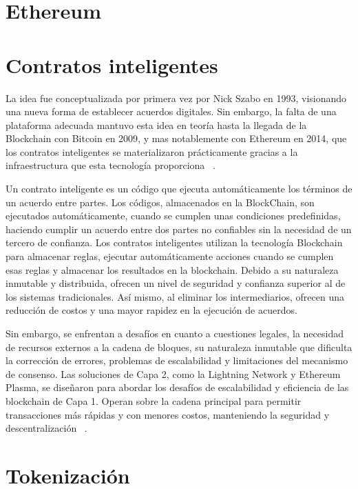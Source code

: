 \section{Ethereum}



\section{Contratos inteligentes}


La idea fue conceptualizada por primera vez por Nick Szabo en 1993, visionando una nueva forma de establecer acuerdos digitales. Sin embargo, la falta de una plataforma adecuada mantuvo esta idea en teoría hasta la llegada de la Blockchain con Bitcoin en 2009, y mas notablemente con Ethereum en 2014, que los contratos inteligentes se materializaron prácticamente gracias a la infraestructura que esta tecnología proporciona ~\cite{smartcontractHistoria}.

Un contrato inteligente es un código que ejecuta automáticamente los términos de un acuerdo entre partes. Los códigos, almacenados en la BlockChain, son ejecutados automáticamente, cuando se cumplen unas condiciones predefinidas, haciendo cumplir un acuerdo entre dos partes no confiables sin la necesidad de un tercero de confianza.
Los contratos inteligentes utilizan la tecnología Blockchain para almacenar reglas, ejecutar automáticamente acciones cuando se cumplen esas reglas y almacenar los resultados en la blockchain. Debido a su naturaleza inmutable y distribuida, ofrecen un nivel de seguridad y confianza superior al de los sistemas tradicionales. Así mismo, al eliminar los intermediarios, ofrecen una reducción de costos y una mayor rapidez en la ejecución de acuerdos.

Sin embargo, se enfrentan a desafíos en cuanto a cuestiones legales, la necesidad de recursos externos a la cadena de bloques, su naturaleza inmutable que dificulta la corrección de errores, problemas de escalabilidad y limitaciones del mecanismo de consenso. Las soluciones de Capa 2, como la Lightning Network y Ethereum Plasma, se diseñaron para abordar los desafíos de escalabilidad y eficiencia de las blockchain de Capa 1. Operan sobre la cadena principal para permitir transacciones más rápidas y con menores costos, manteniendo la seguridad y descentralización ~\cite{AplicacionesDesafiosSmartcontract}. 



\section{Tokenización}

